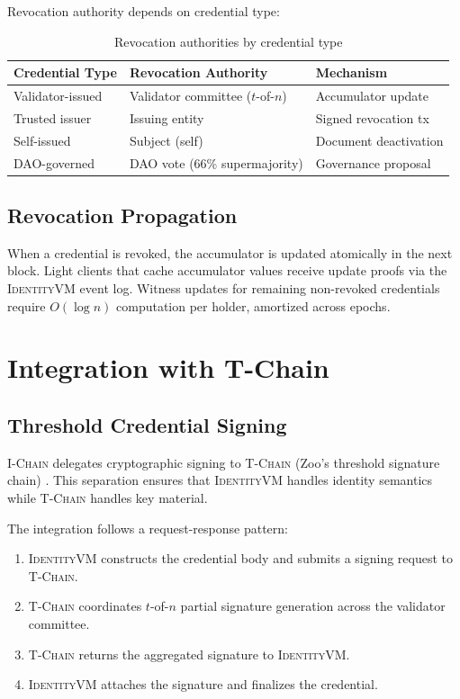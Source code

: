 \documentclass[11pt,letterpaper]{article}
\theoremstyle{definition}
\theoremstyle{remark}
\newcommand{\IChain}{\textsc{I-Chain}}
\newcommand{\TChain}{\textsc{T-Chain}}
\newcommand{\IdentityVM}{\textsc{IdentityVM}}
\begin{document}
Revocation authority depends on credential type:

\begin{table}[h]
\centering
\begin{tabular}{lll}
\toprule
\textbf{Credential Type} & \textbf{Revocation Authority} & \textbf{Mechanism} \\
\midrule
Validator-issued & Validator committee ($t$-of-$n$) & Accumulator update \\
Trusted issuer & Issuing entity & Signed revocation tx \\
Self-issued & Subject (self) & Document deactivation \\
DAO-governed & DAO vote (66\% supermajority) & Governance proposal \\
\bottomrule
\end{tabular}
\caption{Revocation authorities by credential type}
\label{tab:revocation}
\end{table}

\subsection{Revocation Propagation}

When a credential is revoked, the accumulator is updated atomically in the next block. Light clients that cache accumulator values receive update proofs via the \IdentityVM{} event log. Witness updates for remaining non-revoked credentials require $O(\log n)$ computation per holder, amortized across epochs.

\section{Integration with T-Chain}

\subsection{Threshold Credential Signing}

\IChain{} delegates cryptographic signing to \TChain{} (Zoo's threshold signature chain) \cite{zoo-threshold-signatures}. This separation ensures that \IdentityVM{} handles identity semantics while \TChain{} handles key material.

The integration follows a request-response pattern:

\begin{enumerate}
\item \IdentityVM{} constructs the credential body and submits a signing request to \TChain{}.
\item \TChain{} coordinates $t$-of-$n$ partial signature generation across the validator committee.
\item \TChain{} returns the aggregated signature to \IdentityVM{}.
\item \IdentityVM{} attaches the signature and finalizes the credential.
\end{enumerate}
\end{document}
